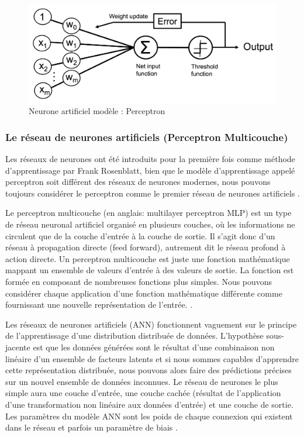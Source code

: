 	\begin{figure}[hth]%
		\centering
		\includegraphics[width=\textwidth]{images/perceptron_neuron.png}
		\caption{Neurone artificiel modèle : Perceptron \cite{ml2008python}
		}
		\label{fig:perceptron_neuron}
	\end{figure}

	\subsubsection{Le réseau de neurones artificiels (Perceptron Multicouche)}
	
	Les réseaux de neurones ont été introduits pour la première fois comme méthode d'apprentissage par Frank Rosenblatt, bien que le modèle d'apprentissage appelé perceptron soit différent des réseaux de neurones modernes, nous pouvons toujours considérer le perceptron comme le premier réseau de neurones artificiels \cite{sarkar2017practical}.

	Le perceptron multicouche (en anglais: multilayer perceptron MLP) est un type de réseau neuronal artificiel organisé en plusieurs couches, où les informations ne circulent que de la couche d'entrée à la couche de sortie. Il s'agit donc d'un réseau à propagation directe (feed forward), autrement dit le réseau profond à action directe. Un perceptron multicouche est juste une fonction mathématique mappant un ensemble de valeurs d'entrée à des valeurs de sortie. La fonction est formée en composant de nombreuses fonctions plus simples. Nous pouvons considérer chaque application d'une fonction mathématique différente comme fournissant une nouvelle représentation de l'entrée. \cite{goodfellow2016deep,antoine2018apprentissage}.
	
	Les réseaux de neurones artificiels (ANN) fonctionnent vaguement sur le principe de l'apprentissage d'une distribution distribuée de données.
	L'hypothèse sous-jacente est que les données générées sont le résultat d'une combinaison non linéaire d'un ensemble de facteurs latents et si nous sommes capables d'apprendre cette représentation distribuée, nous pouvons alors faire des prédictions précises sur un nouvel ensemble de données inconnues. Le réseau de neurones le plus simple aura une couche d'entrée, une couche cachée (résultat de l'application d'une transformation non linéaire aux données d'entrée) et une couche de sortie. Les paramètres du modèle ANN sont les poids de chaque connexion qui existent dans le réseau et parfois un paramètre de biais \cite{sarkar2017practical}.
	
